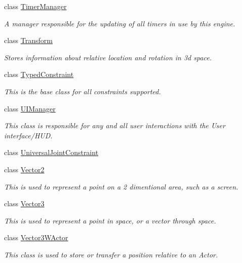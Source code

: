 \begin{DoxyCompactItemize}
class \hyperlink{classphys_1_1TimerManager}{TimerManager}
\begin{DoxyCompactList}\small\item\em A manager responsible for the updating of all timers in use by this engine. \item\end{DoxyCompactList}\item 
class \hyperlink{classphys_1_1Transform}{Transform}
\begin{DoxyCompactList}\small\item\em Stores information about relative location and rotation in 3d space. \item\end{DoxyCompactList}\item 
class \hyperlink{classphys_1_1TypedConstraint}{TypedConstraint}
\begin{DoxyCompactList}\small\item\em This is the base class for all constraints supported. \item\end{DoxyCompactList}\item 
class \hyperlink{classphys_1_1UIManager}{UIManager}
\begin{DoxyCompactList}\small\item\em This class is responsible for any and all user interactions with the User interface/HUD. \item\end{DoxyCompactList}\item 
class \hyperlink{classphys_1_1UniversalJointConstraint}{UniversalJointConstraint}
\item 
class \hyperlink{classphys_1_1Vector2}{Vector2}
\begin{DoxyCompactList}\small\item\em This is used to represent a point on a 2 dimentional area, such as a screen. \item\end{DoxyCompactList}\item 
class \hyperlink{classphys_1_1Vector3}{Vector3}
\begin{DoxyCompactList}\small\item\em This is used to represent a point in space, or a vector through space. \item\end{DoxyCompactList}\item 
class \hyperlink{classphys_1_1Vector3WActor}{Vector3WActor}
\begin{DoxyCompactList}\small\item\em This class is used to store or transfer a position relative to an Actor. \item\end{DoxyCompactList}\item 

\end{DoxyCompactItemize}
